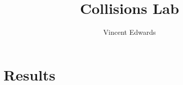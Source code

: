 \documentclass[12pt]{article} %
\title{Collisions Lab}
\author{Vincent Edwards}
\begin{document}
\maketitle
\newpage

\section{Results}
\end{document}
